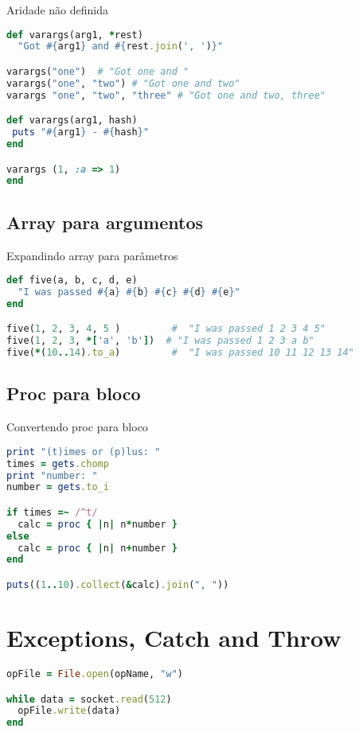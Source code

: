 \documentclass[serif,mathserif]{article}
\begin{document}
Aridade não definida

\begin{lstlisting}[language=ruby]
def varargs(arg1, *rest)
  "Got #{arg1} and #{rest.join(', ')}"

varargs("one")  # "Got one and "
varargs("one", "two") # "Got one and two"
varargs "one", "two", "three" # "Got one and two, three"

def varargs(arg1, hash)
 puts "#{arg1} - #{hash}"
end

varargs (1, :a => 1)
end
\end{lstlisting}

\subsection{Array para argumentos}

Expandindo array para parâmetros

\begin{lstlisting}[language=ruby]
def five(a, b, c, d, e)
  "I was passed #{a} #{b} #{c} #{d} #{e}"
end

five(1, 2, 3, 4, 5 )         #  "I was passed 1 2 3 4 5"
five(1, 2, 3, *['a', 'b'])  # "I was passed 1 2 3 a b"
five(*(10..14).to_a)         #  "I was passed 10 11 12 13 14"
\end{lstlisting}

\subsection{Proc para bloco}

Convertendo proc para bloco

\begin{lstlisting}[language=ruby]
print "(t)imes or (p)lus: "
times = gets.chomp
print "number: "
number = gets.to_i

if times =~ /^t/
  calc = proc { |n| n*number }
else
  calc = proc { |n| n+number }
end

puts((1..10).collect(&calc).join(", "))
\end{lstlisting}

\section{Exceptions, Catch and Throw}

\begin{lstlisting}[language=ruby]
opFile = File.open(opName, "w")

while data = socket.read(512)
  opFile.write(data)
end
\end{lstlisting}
\end{document}

